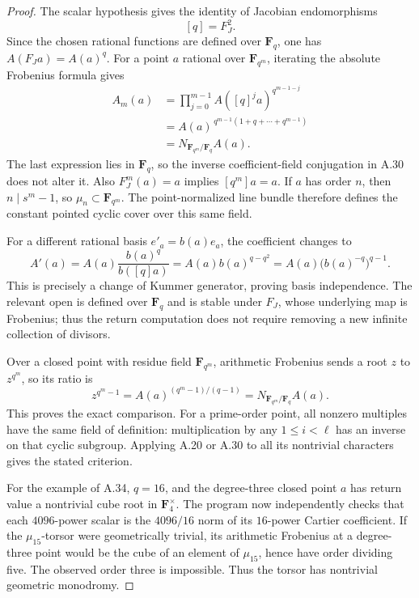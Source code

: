 \documentclass[11pt]{article}
\begin{document}
\begin{proof}
The scalar hypothesis gives the identity of Jacobian
endomorphisms
\[
                             [q]=F_J^2.
\]
Since the chosen rational functions are defined over
\(\mathbf F_q\), one has \(A(F_Ja)=A(a)^q\).
For a point \(a\) rational over \(\mathbf F_{q^m}\),
iterating the absolute Frobenius formula gives
\[
\begin{aligned}
 A_m(a)
  &=\prod_{j=0}^{m-1}
      A([q]^j a)^{q^{m-1-j}}\\
  &=A(a)^{\,q^{m-1}(1+q+\cdots+q^{m-1})}\\
  &=N_{\mathbf F_{q^m}/\mathbf F_q}A(a).
\end{aligned}
\]
The last expression lies in \(\mathbf F_q\), so the inverse
coefficient-field conjugation in A.30 does not alter it.
Also \(F_J^m(a)=a\) implies \([q^m]a=a\).
If \(a\) has order \(n\), then \(n\mid s^m-1\), so
\(\mu_n\subset\mathbf F_{q^m}\).
The point-normalized line bundle therefore defines the
constant pointed cyclic cover over this same field.

For a different rational basis \(e'_a=b(a)e_a\), the coefficient
changes to
\[
 A'(a)=A(a)\frac{b(a)^q}{b([q]a)}
       =A(a)b(a)^{q-q^2}
       =A(a)\bigl(b(a)^{-q}\bigr)^{q-1}.
\]
This is precisely a change of Kummer generator, proving
basis independence. The relevant open is defined over
\(\mathbf F_q\) and is stable under \(F_J\), whose underlying
map is Frobenius; thus the return computation does not
require removing a new infinite collection of divisors.

Over a closed point with residue field \(\mathbf F_{q^m}\),
arithmetic Frobenius sends a root \(z\) to \(z^{q^m}\), so
its ratio is
\[
             z^{q^m-1}
              =A(a)^{(q^m-1)/(q-1)}
              =N_{\mathbf F_{q^m}/\mathbf F_q}A(a).
\]
This proves the exact comparison. For a prime-order
point, all nonzero multiples have the same field of
definition: multiplication by any \(1\le i<\ell\)
has an inverse on that cyclic subgroup.
Applying A.20 or A.30 to all its nontrivial characters
gives the stated criterion.

For the example of A.34, \(q=16\), and the degree-three
closed point \(a\) has return value a nontrivial cube
root in \(\mathbf F_4^\times\).
The program now independently checks that each
\(4096\)-power scalar is the \(4096/16\) norm of its
\(16\)-power Cartier coefficient.
If the \(\mu_{15}\)-torsor were geometrically trivial,
its arithmetic Frobenius at a degree-three point would
be the cube of an element of \(\mu_{15}\), hence have
order dividing five. The observed order three is
impossible. Thus the torsor has nontrivial geometric
monodromy.


\end{proof}
\end{document}
